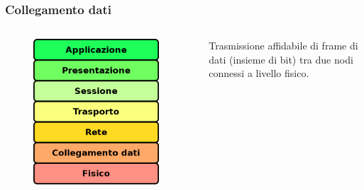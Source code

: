 \documentclass{beamer}
\begin{document}
\subsubsection*{Collegamento dati}
\begin{frame}{\insertsection}{\insertsubsection}
\begin{columns}
\begin{figure}
\includegraphics[width=0.95\textwidth]{imgs/01-iso-osi.drawio.png}
\end{figure}
\begin{block}{\insertsubsubsection}
Trasmissione affidabile di frame di dati (insieme di bit) tra due nodi connessi a livello fisico.
\end{block}
\end{columns}
\end{frame}
\end{document}
